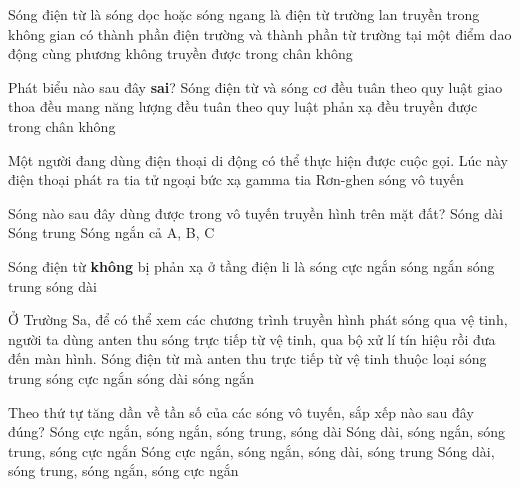 
\setcounter{paragraph}{0}
\setcounter{ex}{0} 
\PhanI
\begin{ex} %
 Sóng điện từ
\choice
{là sóng dọc hoặc sóng ngang}
{\True là điện từ trường lan truyền trong không gian}
{có thành phần điện trường và thành phần từ trường tại một điểm dao động cùng phương}
{không truyền được trong chân không}
\end{ex} 
\begin{ex} %
Phát biểu nào sau đây \textbf{sai}? Sóng điện từ và sóng cơ
\choice
{đều tuân theo quy luật giao thoa}
{đều mang năng lượng}
{đều tuân theo quy luật phản xạ}
{\True đều truyền được trong chân không}
\end{ex} 
\begin{ex} %
Một người đang dùng điện thoại di động có thể thực hiện được cuộc gọi. Lúc này điện thoại phát ra
\choice
{tia tử ngoại}
{bức xạ gamma}
{tia Rơn-ghen}
{\True sóng vô tuyến}
\end{ex} 
\begin{ex} %
Sóng nào sau đây dùng được trong vô tuyến truyền hình trên mặt đất?
\choice
{Sóng dài}
{Sóng trung}
{\True Sóng ngắn}
{cả A, B, C}
\end{ex} 
\begin{ex} %
Sóng điện từ \textbf{không} bị phản xạ ở tầng điện li là
\choice
{\True sóng cực ngắn}
{sóng ngắn}
{sóng trung}
{sóng dài}
\end{ex} 
\begin{ex} %
 Ở Trường Sa, để có thể xem các chương trình truyền hình phát sóng qua vệ tinh, người ta dùng anten thu sóng trực tiếp từ vệ tinh, qua bộ xử lí tín hiệu rồi đưa đến màn hình. Sóng điện từ mà anten thu trực tiếp từ vệ tinh thuộc loại
\choice
{sóng trung}
{\True sóng cực ngắn}
{sóng dài}
{sóng ngắn}
\end{ex} 
\begin{ex} %
Theo thứ tự tăng dần về tần số của các sóng vô tuyến, sắp xếp nào sau đây đúng?
\choice
{Sóng cực ngắn, sóng ngắn, sóng trung, sóng dài}
{Sóng dài, sóng ngắn, sóng trung, sóng cực ngắn}
{Sóng cực ngắn, sóng ngắn, sóng dài, sóng trung}
{\True Sóng dài, sóng trung, sóng ngắn, sóng cực ngắn}
\end{ex} 

